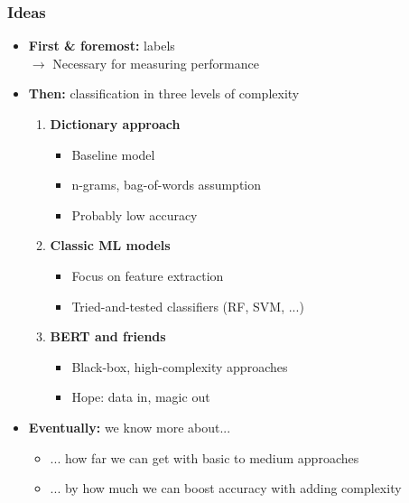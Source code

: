 \documentclass[t]{beamer}
\newcommand{\highlight}[1]{\colorbox{gray!20}{#1}}
\begin{document}
\begin{frame}
\frametitle{Ideas}

\begin{itemize}
  \item \textbf{First \& foremost:} \highlight{labels} \\
  $\rightarrow$ Necessary for measuring performance
  \item \textbf{Then:} \highlight{classification} in three levels of complexity
  \begin{enumerate}
    \footnotesize
    \item \textbf{Dictionary approach}
    \begin{itemize}
      \item Baseline model
      \item n-grams, bag-of-words assumption
      \item Probably low accuracy
    \end{itemize}
    \item \textbf{Classic ML models} 
    \begin{itemize}
      \item Focus on feature extraction
      \item Tried-and-tested classifiers (RF, SVM, ...)
    \end{itemize}
    \item \textbf{BERT and friends} 
    \begin{itemize}
      \item Black-box, high-complexity approaches
      \item Hope: data in, magic out
    \end{itemize}
  \end{enumerate}
  \item \textbf{Eventually:} we know more about...
  \begin{itemize}
    \footnotesize
    \item ... how far we can get with basic to medium approaches
    \item ... by how much we can boost accuracy with adding complexity
  \end{itemize}
\end{itemize}

\end{frame}

\end{document}
